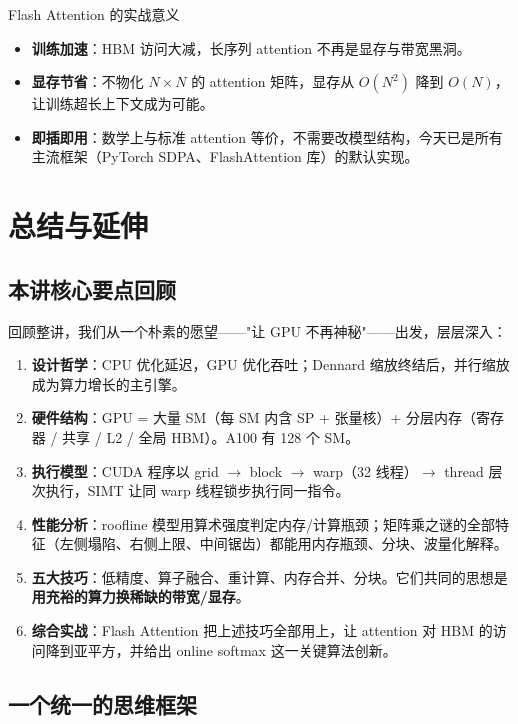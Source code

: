 \documentclass[a4paper]{article}
\begin{document}
\begin{practicebox}{Flash Attention 的实战意义}
\begin{itemize}
\item \textbf{训练加速}：HBM 访问大减，长序列 attention 不再是显存与带宽黑洞。
\item \textbf{显存节省}：不物化 $N \times N$ 的 attention 矩阵，显存从 $O(N^2)$ 降到 $O(N)$，让训练超长上下文成为可能。
\item \textbf{即插即用}：数学上与标准 attention 等价，不需要改模型结构，今天已是所有主流框架（PyTorch SDPA、FlashAttention 库）的默认实现。
\end{itemize}
\end{practicebox}

\section{总结与延伸}

\subsection{本讲核心要点回顾}

回顾整讲，我们从一个朴素的愿望——"让 GPU 不再神秘"——出发，层层深入：

\begin{enumerate}
\item \textbf{设计哲学}：CPU 优化延迟，GPU 优化吞吐；Dennard 缩放终结后，并行缩放成为算力增长的主引擎。
\item \textbf{硬件结构}：GPU = 大量 SM（每 SM 内含 SP + 张量核）+ 分层内存（寄存器 / 共享 / L2 / 全局 HBM）。A100 有 128 个 SM。
\item \textbf{执行模型}：CUDA 程序以 grid $\to$ block $\to$ warp（32 线程）$\to$ thread 层次执行，SIMT 让同 warp 线程锁步执行同一指令。
\item \textbf{性能分析}：roofline 模型用算术强度判定内存/计算瓶颈；矩阵乘之谜的全部特征（左侧塌陷、右侧上限、中间锯齿）都能用内存瓶颈、分块、波量化解释。
\item \textbf{五大技巧}：低精度、算子融合、重计算、内存合并、分块。它们共同的思想是\textbf{用充裕的算力换稀缺的带宽/显存}。
\item \textbf{综合实战}：Flash Attention 把上述技巧全部用上，让 attention 对 HBM 的访问降到亚平方，并给出 online softmax 这一关键算法创新。
\end{enumerate}

\subsection{一个统一的思维框架}
\end{document}

